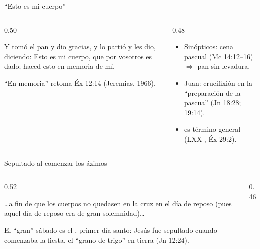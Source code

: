 \begin{frame}{``Esto es mi cuerpo''}
\begin{columns}[t,onlytextwidth]
\begin{column}{0.50\textwidth}
\begin{cita}Y tomó el pan y dio gracias, y lo partió y les dio, diciendo: Esto es mi cuerpo, que por vosotros es dado; haced esto en memoria de mí.\end{cita}
\small ``En memoria'' retoma Éx 12:14 (Jeremias, 1966).
\end{column}
\begin{column}{0.48\textwidth}\scriptsize
\begin{itemize}
\item Sinópticos: cena pascual (Mc 14:12--16) $\Rightarrow$ pan sin levadura.
\item Juan: crucifixión en la ``preparación de la pascua'' (Jn 18:28; 19:14).
\item {} es término general (LXX , Éx 29:2).
\end{itemize}
\end{column}
\end{columns}
\end{frame}

\begin{frame}{Sepultado al comenzar los ázimos}
\begin{columns}[t,onlytextwidth]
\begin{column}{0.52\textwidth}
\begin{cita}\ldots{}a fin de que los cuerpos no quedasen en la cruz en el día de reposo (pues aquel día de reposo era de gran solemnidad)\ldots{}\end{cita}
\small El ``gran'' sábado es el , primer día santo: Jesús fue sepultado cuando comenzaba la fiesta, el ``grano de trigo'' en tierra (Jn 12:24).
\end{column}
\begin{column}{0.46\textwidth}\scriptsize
{}
\end{column}
\end{columns}
\end{frame}


